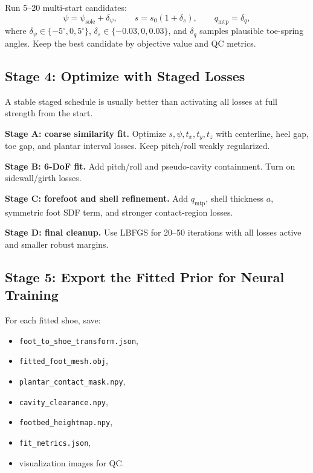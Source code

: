 \documentclass[11pt]{article}
\begin{document}
Run 5--20 multi-start candidates:
\begin{equation}
\psi=\psi_{\mathrm{sole}}+\delta_{\psi},
\qquad
s=s_0(1+\delta_s),
\qquad
q_{\mathrm{mtp}}=\delta_q,
\end{equation}
where $\delta_{\psi}\in\{-5^\circ,0,5^\circ\}$, $\delta_s\in\{-0.03,0,0.03\}$, and $\delta_q$ samples plausible toe-spring angles. Keep the best candidate by objective value and QC metrics.

\subsection{Stage 4: Optimize with Staged Losses}

A stable staged schedule is usually better than activating all losses at full strength from the start.

\textbf{Stage A: coarse similarity fit.} Optimize $s,\psi,t_x,t_y,t_z$ with centerline, heel gap, toe gap, and plantar interval losses. Keep pitch/roll weakly regularized.

\textbf{Stage B: 6-DoF fit.} Add pitch/roll and pseudo-cavity containment. Turn on sidewall/girth losses.

\textbf{Stage C: forefoot and shell refinement.} Add $q_{\mathrm{mtp}}$, shell thickness $a$, symmetric foot SDF term, and stronger contact-region losses.

\textbf{Stage D: final cleanup.} Use LBFGS for 20--50 iterations with all losses active and smaller robust margins.

\subsection{Stage 5: Export the Fitted Prior for Neural Training}

For each fitted shoe, save:

\begin{itemize}
  \item \texttt{foot\_to\_shoe\_transform.json},
  \item \texttt{fitted\_foot\_mesh.obj},
  \item \texttt{plantar\_contact\_mask.npy},
  \item \texttt{cavity\_clearance.npy},
  \item \texttt{footbed\_heightmap.npy},
  \item \texttt{fit\_metrics.json},
  \item visualization images for QC.
\end{itemize}
\end{document}
